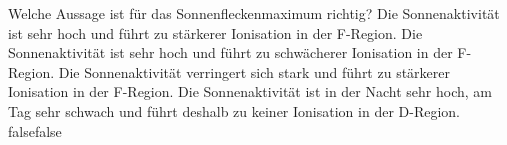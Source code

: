     {Welche Aussage ist für das Sonnenfleckenmaximum richtig?}
    {Die Sonnenaktivität ist sehr hoch und führt zu stärkerer Ionisation in der F-Region.}
    {Die Sonnenaktivität ist sehr hoch und führt zu schwächerer Ionisation in der F-Region.}
    {Die Sonnenaktivität verringert sich stark und führt zu stärkerer Ionisation in der F-Region.}
    {Die Sonnenaktivität ist in der Nacht sehr hoch, am Tag sehr schwach und führt deshalb zu keiner Ionisation in der D-Region.}
    {false}{false}